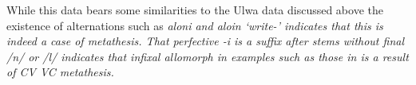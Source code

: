 While this data bears some similarities to the Ulwa data
discussed above the existence of alternations
such as \it{aloni} and \it{aloin} `write-'
indicates that this is indeed a case of metathesis.
That perfective \it{-i} is a suffix
after stems without final /n/ or /l/ indicates
that infixal allomorph in examples such as those in 
is a result of CV {\ra} VC metathesis.

